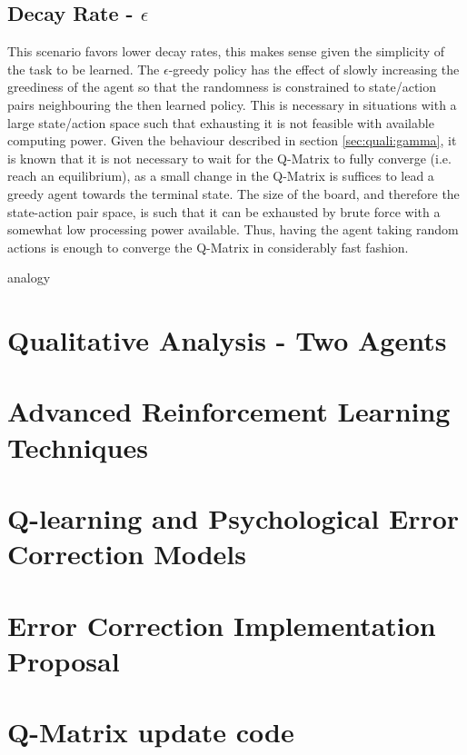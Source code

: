 \documentclass[11pt]{article}
\begin{document}
    \subsection{Decay Rate - $\epsilon$}
        This scenario favors lower decay rates, this makes sense given the simplicity of the task to be learned.
        The $\epsilon$-greedy policy has the effect of slowly increasing the greediness of the agent so that the randomness is constrained to state/action pairs neighbouring the then learned policy. This is necessary in situations with a large state/action space such that exhausting it is not feasible with available computing power.
        Given the behaviour described in section \ref{sec:quali:gamma}, it is known that it is not necessary to wait for the Q-Matrix to fully converge (i.e. reach an equilibrium), as a small change in the Q-Matrix is suffices to lead a greedy agent towards the terminal state. The size of the board, and therefore the state-action pair space, is such that it can be exhausted by brute force with a somewhat low processing power available. Thus, having the agent taking random actions is enough to converge the Q-Matrix in considerably fast fashion.




    analogy


\section{Qualitative Analysis - Two Agents}
\section{Advanced Reinforcement Learning Techniques}
\section{Q-learning and Psychological Error Correction Models}
\section{Error Correction Implementation Proposal}



\appendix
\section{Q-Matrix update code}
\end{document}

